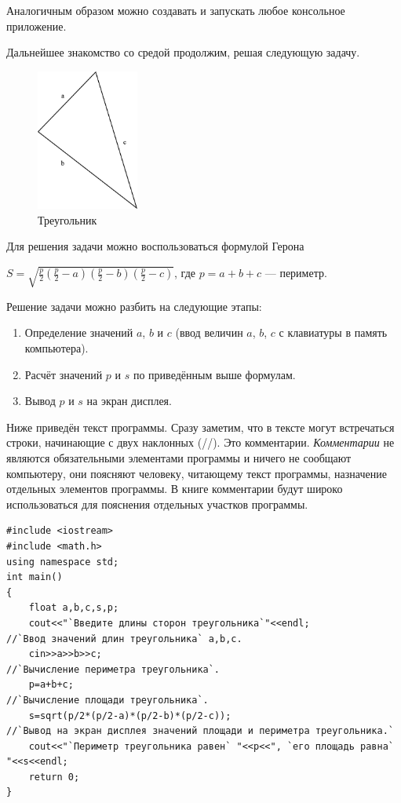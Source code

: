Аналогичным образом можно создавать и запускать любое консольное приложение.

Дальнейшее знакомство со средой  продолжим, решая следующую задачу.


\begin{figure}[htb]
\begin{center}
\includegraphics[width=0.3\textwidth]{img/ris_1_7}
\caption{Треугольник}
\label{ch01:refDrawing6}
\end{center}
\end{figure}

Для решения задачи можно воспользоваться формулой Герона 

$S=\sqrt{\frac{p}{2}\left(\frac{p}{2}-a\right)\left(\frac{p}{2}-b\right)\left(\frac{p}{2}-c\right)}$, 
где $p=a+b+c$ --- периметр.

Решение задачи можно разбить на следующие этапы:

\begin{enumerate}
\item  Определение значений $a$, $b$ и $c$ (ввод величин $a$, $b$, $c$ с клавиатуры в память компьютера).
\item  Расчёт значений $p$ и $s$ по приведённым выше формулам.
\item Вывод $p$ и $s$ на экран дисплея.
\end{enumerate}
Ниже приведён текст программы. Сразу заметим, что в тексте могут встречаться строки, начинающие с двух наклонных (//).
Это комментарии. \emph{Комментарии} не являются обязательными элементами программы и ничего не сообщают компьютеру, 
они поясняют человеку, читающему текст программы, назначение отдельных элементов программы. В книге комментарии 
будут широко использоваться для пояснения
отдельных участков программы.
\begin{lstlisting}
#include <iostream> 
#include <math.h> 
using namespace std; 
int main() 
{ 
    float a,b,c,s,p; 
    cout<<"`Введите длины сторон треугольника`"<<endl; 
//`Ввод значений длин треугольника` a,b,c.
    cin>>a>>b>>c; 
//`Вычисление периметра треугольника`.
    p=a+b+c; 
//`Вычисление площади треугольника`.
    s=sqrt(p/2*(p/2-a)*(p/2-b)*(p/2-c));
//`Вывод на экран дисплея значений площади и периметра треугольника.` 
    cout<<"`Периметр треугольника равен` "<<p<<", `его площадь равна` "<<s<<endl; 
    return 0; 
}
\end{lstlisting}

